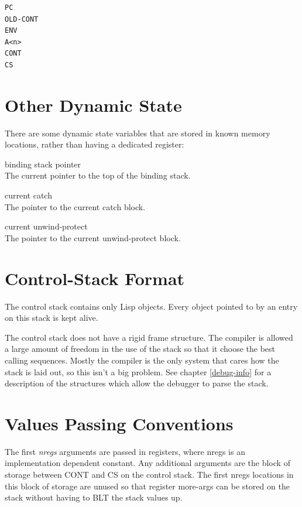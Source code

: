 {\begin{itemize, spread 0, spacing 1}
\begin{verbatim}
PC
OLD-CONT
ENV
A<n>
CONT
CS
\end{verbatim}
\section{Other Dynamic State}

There are some dynamic state variables that are stored in known memory
locations, rather than having a dedicated register:
\begin{description}
binding stack pointer\\The current pointer to the top of the binding stack.

current catch\\The pointer to the current catch block.

current unwind-protect\\The pointer to the current unwind-protect block.
\end{description}



\section{Control-Stack Format}
\label{Control-Stack-Format}


The control stack contains only Lisp objects.  Every object pointed to by an
entry on this stack is kept alive.

The \rtccl control stack does not have a rigid frame structure.  The compiler
is allowed a large amount of freedom in the use of the stack so that it choose
the best calling sequences.  Mostly the compiler is the only system that cares
how the stack is laid out, so this isn't a big problem.  See chapter
\ref{debug-info} for a description of the structures which allow the debugger
to parse the stack.



\section{Values Passing Conventions}


The first {\it nregs} arguments are passed in registers, where nregs is an
implementation dependent constant.  Any additional arguments are the block of
storage between CONT and CS on the control stack.  The first nregs locations in
this block of storage are unused so that register more-args can be stored on
the stack without having to BLT the stack values up.


\end{itemize, spread 0, spacing 1}}
